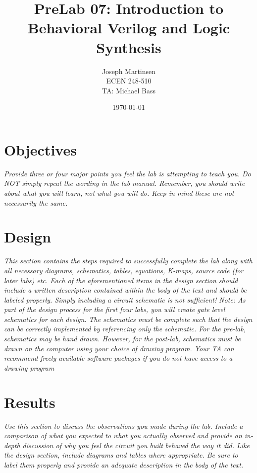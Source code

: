 \documentclass[titlepage]{article}
\title{\textbf{PreLab 07: Introduction to Behavioral Verilog and Logic
Synthesis}}
\author{Joseph Martinsen \\ ECEN 248-510 \\ TA: Michael Bass}
\date{\today}
\begin{document}
\maketitle

\ifx

\section*{Objectives}
\textit{Provide three or four major points you feel the lab is attempting to
teach you. Do NOT simply repeat the wording in the lab manual. Remember, you
should write about what you will learn, not what you will do. Keep in mind
these are not necessarily the same.}

\section*{Design}

\textit{This section contains the steps required to successfully complete the
lab along with all necessary diagrams, schematics, tables, equations, K-maps,
source code (for later labs) etc. Each of the aforementioned items in the design
section should include a written description contained within the body of the
text and should be labeled properly. Simply including a circuit schematic is
not sufficient! Note: As part of the design process for the first four labs,
you will create gate level schematics for each design. The schematics must be
complete such that the design can be correctly implemented by referencing only
the schematic. For the pre-lab, schematics may be hand drawn. However, for the
post-lab, schematics must be drawn on the computer using your choice of
drawing program. Your TA can recommend freely available software packages if
 you do not have access to a drawing program}

\section*{Results}

\textit{Use this section to discuss the observations you made during the lab.
 Include a comparison of what you expected to what you actually observed and
 provide an in-depth discussion of why you feel the circuit you built behaved
 the way it did. Like the design section, include diagrams and tables where
 appropriate. Be sure to label them properly and provide an adequate description
  in the body of the text.}
\end{document}
